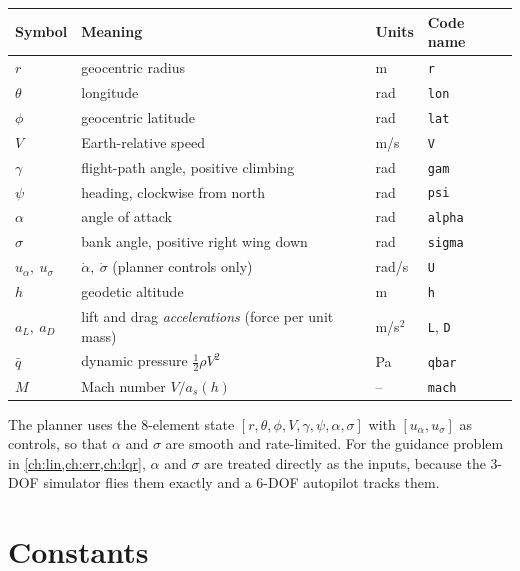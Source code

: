 \documentclass[11pt]{report}
\numberwithin{equation}{chapter}
\newcommand{\aL}{a_L}
\newcommand{\aD}{a_D}
\newcommand{\code}[1]{\texttt{#1}}
\begin{document}
\begin{center}
\begin{tabular}{@{}llll@{}}
\toprule
Symbol & Meaning & Units & Code name \\
\midrule
$r$ & geocentric radius & m & \code{r} \\
$\theta$ & longitude & rad & \code{lon} \\
$\phi$ & geocentric latitude & rad & \code{lat} \\
$V$ & Earth-relative speed & m/s & \code{V} \\
$\gamma$ & flight-path angle, positive climbing & rad & \code{gam} \\
$\psi$ & heading, clockwise from north & rad & \code{psi} \\
$\alpha$ & angle of attack & rad & \code{alpha} \\
$\sigma$ & bank angle, positive right wing down & rad & \code{sigma} \\
$u_\alpha,\ u_\sigma$ & $\dot\alpha,\ \dot\sigma$ (planner controls only) & rad/s & \code{U} \\
$h$ & geodetic altitude & m & \code{h} \\
$\aL,\ \aD$ & lift and drag \emph{accelerations} (force per unit mass) & m/s$^2$ & \code{L}, \code{D} \\
$\bar q$ & dynamic pressure $\tfrac12\rho V^2$ & Pa & \code{qbar} \\
$M$ & Mach number $V/a_s(h)$ & -- & \code{mach} \\
\bottomrule
\end{tabular}
\end{center}

The planner uses the 8-element state $[r,\theta,\phi,V,\gamma,\psi,\alpha,\sigma]$ with
$[u_\alpha,u_\sigma]$ as controls, so that $\alpha$ and $\sigma$ are smooth and
rate-limited. For the guidance problem in \cref{ch:lin,ch:err,ch:lqr}, $\alpha$ and
$\sigma$ are treated directly as the inputs, because the 3-DOF simulator flies them
exactly and a 6-DOF autopilot tracks them.

\section{Constants}
\end{document}
